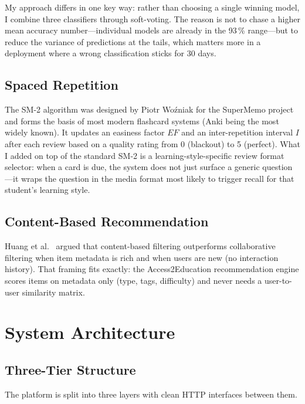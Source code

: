 \documentclass[12pt,a4paper]{article}
\begin{document}
My approach differs in one key way: rather than choosing a single
winning model, I combine three classifiers through soft-voting.
The reason is not to chase a higher mean accuracy number---individual
models are already in the 93\,\% range---but to reduce the variance
of predictions at the tails, which matters more in a deployment where
a wrong classification sticks for 30 days.

\subsection{Spaced Repetition}

The SM-2 algorithm \cite{supermemo} was designed by Piotr
Wo\'zniak for the SuperMemo project and forms the basis of most
modern flashcard systems (Anki being the most widely known). It
updates an easiness factor $EF$ and an inter-repetition interval $I$
after each review based on a quality rating from 0 (blackout) to 5
(perfect). What I added on top of the standard SM-2 is a
learning-style-specific review format selector: when a card is due,
the system does not just surface a generic question---it wraps the
question in the media format most likely to trigger recall for that
student's learning style.

\subsection{Content-Based Recommendation}

Huang et al.\ \cite{huang2019} argued that content-based filtering
outperforms collaborative filtering when item metadata is rich and
when users are new (no interaction history). That framing fits
exactly: the Access2Education recommendation engine scores items on
metadata only (type, tags, difficulty) and never needs a
user-to-user similarity matrix.

\section{System Architecture}

\subsection{Three-Tier Structure}

The platform is split into three layers with clean HTTP interfaces
between them.
\end{document}
